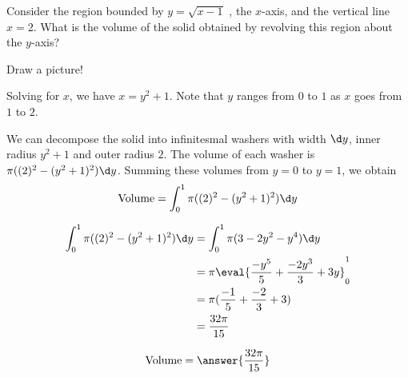 \documentclass{ximera}
\author{Steven Gubkin}
\begin{document}
\begin{exercise}



Consider the region bounded by $y =\sqrt{x-1}$ , the $x$-axis, and the
vertical line $x=2$.  What is the volume of the solid obtained by
revolving this region about the $y$-axis?
\begin{hint}
  Draw a picture!
\end{hint}

\begin{hint}
  Solving for $x$, we have $x = y^2+1$.  Note that $y$ ranges from $0$ to $1$ as $x$ goes from $1$ to $2$.
\end{hint}

\begin{hint}
  We can decompose the solid into infinitesmal washers with width
  $\d y$, inner radius $y^2+1$ and outer radius $2$.  The volume of each
  washer is $\pi((2)^2 - (y^2+1)^2)\d y$.  Summing these volumes from
  $y=0$ to $y=1$, we obtain
  \[
  \textrm{Volume} = \int_0^1 \pi((2)^2 - (y^2+1)^2)\d y
  \]
\end{hint}

\begin{hint}
  \begin{align*}
    \int_0^1\pi((2)^2 - (y^2+1)^2)\d y &=  \int_0^1 \pi(3-2y^2-y^4)\d y\\
    &= \pi \eval{\frac{-y^5}{5}+\frac{-2y^3}{3}+3y}_0^1\\
    &=\pi(\frac{-1}{5}+\frac{-2}{3}+3)\\
    &=\frac{32\pi}{15}
  \end{align*}
\end{hint}

\begin{prompt}
  \[
  \textrm{Volume} = \answer{\frac{32\pi}{15}}
  \]
\end{prompt}
\end{exercise}
\end{document}
